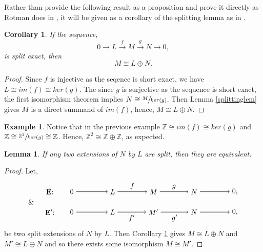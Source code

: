 \documentclass[11.5pt, twoside, a4paper, titlepage]{report}
\providecommand{\bb}[1]{\mathbb{#1}}
\theoremstyle{definition}
\newtheorem{eg}[mydef]{Example}
\theoremstyle{plain}
\newtheorem{lem}[mydef]{Lemma}
\newtheorem{cor}[mydef]{Corollary}
\begin{document}
Rather than provide the following result as a proposition and prove it directly as Rotman does in \cite{Rotman}, it will be given as a corollary of the splitting lemma as in \cite{Schiff}.

\begin{cor} \label{MLNcor}
If the sequence,
\begin{equation*}
0\xrightarrow{}L\xrightarrow{f} M \xrightarrow{g} N \xrightarrow{} 0,
\end{equation*}
is split exact, then
\begin{equation*}
M \cong L \oplus N.
\end{equation*}
\end{cor}
\begin{proof}
Since $f$ is injective as the seqence is short exact, we have $L \cong im(f) \cong ker(g)$. The since $g$ is surjective as the sequence is short exact, the first isomorphism theorem implies $N \cong \sfrac{M}{ker(g)}$. Then Lemma \ref{splittinglem} gives $M$  is a direct summand of $im(f)$, hence, $M\cong L \oplus N$.
\end{proof}

\begin{eg}
Notice that in the previous example $\bb{Z} \cong im(f)\cong ker(g) $ and $\bb{Z} \cong \sfrac{\bb{Z}^2}{ker(g)}\cong \bb{Z}$. Hence, $\bb{Z}^2 \cong \bb{Z} \oplus \bb{Z}$, as expected.
\end{eg}

\begin{lem} \label{splitequivlem}
If any two extensions of $N$ by $L$ are split, then they are equivalent.
\end{lem}
\begin{proof}
Let,
\begin{equation*}
\begin{tikzpicture}[->,-latex, auto, main path/.style={->, semithick}, main node/.style={}]
\node	[main node]		(1) at (1,0)		{$\mathbf{E}$: \quad };
\node	[main node]		(2) at (2,0)		{$0$};
\node	[main node]		(3) at (4,0)		{$L$};
\node [main node]		(4) at (6,0)		{$M$};
\node [main node]		(5) at (8,0)		{$N$};
\node	[main node]		(11) at (10,0)	{$0,$};

\node [main node] 		(12) at (0,-0.5)	{\&};
\node	[main node]		(6) at (1,-1)		{$\mathbf{E'}$: \quad};
\node	[main node]		(7) at (2,-1)		{$0$};
\node	[main node]		(8) at (4,-1)		{$L$};
\node [main node]		(9) at (6,-1)		{$M'$};
\node [main node]		(10) at (8,-1)	{$N$};
\node [main node]		(13) at (10,-1)	{$0,$};

\draw (2) edge [main path] node [auto] {$$} (3);
\draw (3) edge [main path] node [auto] {$f$} (4);
\draw (4) edge [main path] node [auto] {$g$} (5);
\draw (5) edge [main path] (11);

\draw (7) edge [main path] node [auto] {$$} (8);
\draw (8) edge [main path] node [auto, swap] {$f'$} (9);
\draw (9) edge [main path] node [auto, swap] {$g'$} (10);
\draw (10) edge [main path] (13);
\end{tikzpicture}
\end{equation*}
 be two split extensions of $N$ by $L$. Then Corollary \ref{MLNcor} gives $M \cong L\oplus N$ and $M'\cong L \oplus N$ and so there exists some isomorphism $M \cong M'$. 
\end{proof}
\end{document}
